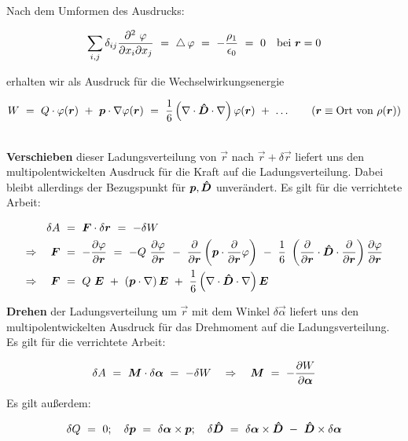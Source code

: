 Nach dem Umformen des Ausdrucks:

\begin{equation*}
\sum_{i,j} \delta_{ij}\frac{\partial^2 \ \varphi}{\partial x_i \partial x_j} \ = \ \laplace\varphi  \ = \ -\frac{\rho_1}{\epsilon_0}  \ = \ 0 \quad \text{bei } \vec{r}=0
\end{equation*}

erhalten wir als Ausdruck für die Wechselwirkungsenergie

\begin{equation*}
W \ = \ Q\cdot\varphi(\vec{r}) \ + \ \vec{p}\cdot\nabla\varphi(\vec{r})  \ = \ \frac{1}{6}\left(\nabla\cdot\tens{D}\cdot\nabla\right)\varphi(\vec{r}) \ + \ \ldots \qquad(\vec{r}\equiv \text{Ort von }\rho(\vec{r}))
\end{equation*}

\ \\
\textbf{Verschieben} dieser Ladungsverteilung von $\vec{r}$ nach $\vec{r} + \delta\vec{r}$ liefert uns den multipolentwickelten Ausdruck für die Kraft auf die Ladungsverteilung. Dabei bleibt allerdings der Bezugspunkt für $\bm{p},\bm{\hat{D}}$ unverändert. Es gilt für die verrichtete Arbeit:

\begin{align*}
\delta A \ &= \ \vec{F} \cdot \delta\vec{r} \ = \ -\delta W \\
\Rightarrow \quad \vec{F}  \ &= \  -\pdiff{\varphi}{\vec{r}}  \ = \ -Q\ \pdiff{\varphi}{\vec{r}} \ - \ \pdiff{}{\vec{r}} \left(\vec{p}\cdot\pdiff{}{\vec{r}}\varphi\right) \ - \ \frac{1}{6} \ \left(\pdiff{}{\vec{r}}\cdot\tens{D}\cdot\pdiff{}{\vec{r}}\right)\pdiff{\varphi}{\vec{r}}\\
\Rightarrow \quad \vec{F} \ &= \ Q \ \vec{E} \ + \ \left(\vec{p}\cdot\nabla\right)\vec{E} \ + \ \frac{1}{6}\left(\nabla\cdot\tens{D}\cdot\nabla\right)\vec{E}
\end{align*}

\newpage
\textbf{Drehen} der Ladungsverteilung um $\vec{r}$ mit dem Winkel $\delta\vec{\alpha}$ liefert uns den multipolentwickelten Ausdruck für das Drehmoment auf die Ladungsverteilung. Es gilt für die verrichtete Arbeit:

\begin{equation*}
\delta A  \ = \ \vec{M}\cdot\delta\vec{\alpha}  \ = \ - \delta W \quad\Rightarrow \quad \vec{M}  \ = \ - \pdiff{W}{\vec{\alpha}}
\end{equation*}

Es gilt außerdem:

\begin{equation*}
\delta Q  \ = \ 0 ; \quad \delta\vec{p}  \ = \  \delta\vec{\alpha}\times\vec{p}; \quad \delta\tens{D}  \ = \ \delta\vec{\alpha}\times\tens{D} \ - \ \tens{D}\times\delta\vec{\alpha}
\end{equation*}
\ \\

